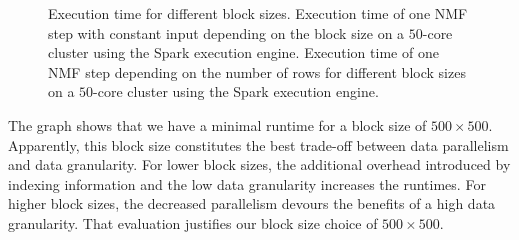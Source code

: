 \begin{figure}
	\centering
	\begin{subfigure}[t]{\dualpgfwidth}
		\caption{}
		\label{fig:blocksizesNMFStep}
	\end{subfigure}
	\begin{subfigure}[t]{\dualpgfwidth}
		\caption{}
		\label{fig:nmfStepDifferentBlocksizes}
	\end{subfigure}
	\caption{Execution time for different block sizes.  Execution time of one NMF step with constant input depending on the block size on a $50$-core cluster using the Spark execution engine.  Execution time of one NMF step depending on the number of rows for different block sizes on a $50$-core cluster using the Spark execution engine.}
	\label{fig:blocksizes}
\end{figure}

The graph shows that we have a minimal runtime for a block size of $500 \times 500$.
Apparently, this block size constitutes the best trade-off between data parallelism and data granularity.
For lower block sizes, the additional overhead introduced by indexing information and the low data granularity increases the runtimes.
For higher block sizes, the decreased parallelism devours the benefits of a high data granularity.
That evaluation justifies our block size choice of $500 \times 500$.

